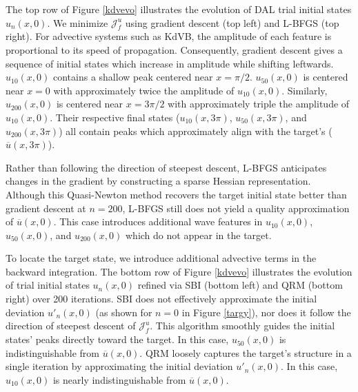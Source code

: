 \documentclass[%
 reprint,
 amsmath,amssymb,
 aps,
 pre,
]{revtex4-2}
\newcommand{\Juf}{\mathcal{J}^{u}_f}
\begin{document}
The top row of Figure \ref{kdvevo} illustrates the evolution of DAL trial initial states $u_n(x,0)$.
We minimize $\Juf$ using gradient descent (top left) and L-BFGS (top right).
For advective systems such as KdVB, the amplitude of each feature is proportional to its speed of propagation.
Consequently, gradient descent gives a sequence of initial states which increase in amplitude while shifting leftwards.
$u_{10}(x,0)$ contains a shallow peak centered near $x=\pi/2$.
$u_{50}(x,0)$ is centered near $x=0$ with approximately twice the amplitude of $u_{10}(x,0)$.
Similarly, $u_{200}(x,0)$ is centered near $x=3\pi/2$ with approximately triple the amplitude of $u_{10}(x,0)$.
Their respective final states ($u_{10}(x,3\pi)$, $u_{50}(x,3\pi)$, and $u_{200}(x,3\pi)$) all contain peaks which approximately align with the target's ($\overline{u}(x,3\pi)$).

Rather than following the direction of steepest descent, L-BFGS anticipates changes in the gradient by constructing a sparse Hessian representation.
Although this Quasi-Newton method recovers the target initial state better than gradient descent at $n=200$, L-BFGS still does not yield a quality approximation of $\overline{u}(x,0)$.
This case introduces additional wave features in $u_{10}(x,0)$, $u_{50}(x,0)$, and $u_{200}(x,0)$ which do not appear in the target.

To locate the target state, we introduce additional advective terms in the backward integration.
The bottom row of Figure \ref{kdvevo} illustrates the evolution of trial initial states $u_n(x,0)$ refined via SBI (bottom left) and QRM (bottom right) over 200 iterations.
SBI does not effectively approximate the initial deviation $u'_n(x,0)$ (as shown for $n=0$ in Figure \ref{targy}), nor does it follow the direction of steepest descent of $\Juf$.
This algorithm smoothly guides the initial states' peaks directly toward the target.
In this case, $u_{50}(x,0)$ is indistinguishable from $\overline{u}(x,0)$.
QRM loosely captures the target's structure in a single iteration by approximating the initial deviation $u'_n(x,0)$.
In this case, $u_{10}(x,0)$ is nearly indistinguishable from $\overline{u}(x,0)$.
\end{document}
